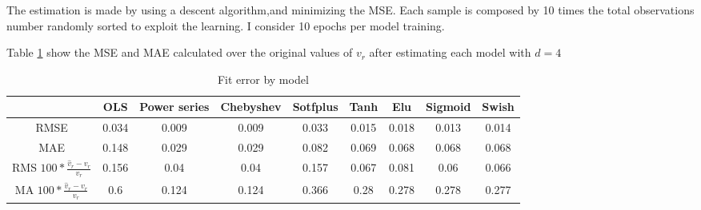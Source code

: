 \documentclass[12pt, a4paper]{article}
\begin{document}
\begin{enumerate}
	The estimation is made by using a descent algorithm,and minimizing the MSE. Each sample is composed by 10 times the total observations number randomly sorted to exploit the learning. I consider 10 epochs per model training. 
\end{enumerate}
Table \ref{tab:1} show the MSE and MAE calculated  over the original values of $v_r$ after estimating each model with $d=4$\\
\begin{table}[!hbt]
	\centering
	\caption{Fit error by model}
	\vspace{3mm}
	\begin{tabular}{|c|cccccccc|}
		\hline
		   & OLS&Power series& Chebyshev&Sotfplus&Tanh&Elu&Sigmoid&Swish\\
		\hline
		RMSE&  0.034 & 0.009 & 0.009 & 0.033 & 0.015 & 0.018 & 0.013 & 0.014 \\
		MAE&  0.148 & 0.029 & 0.029 & 0.082 & 0.069 & 0.068 & 0.068 & 0.068\\
		RMS $100*$ &0.156 & 0.04 &  0.04 &  0.157 & 0.067  &0.081 & 0.06   &0.066\\
		MA  $100*$ &0.6   & 0.124 & 0.124 & 0.366  &0.28   &0.278  &0.278  &0.277\\
		\hline
	\end{tabular}
	\label{tab:1}
\end{table}
\end{document}
